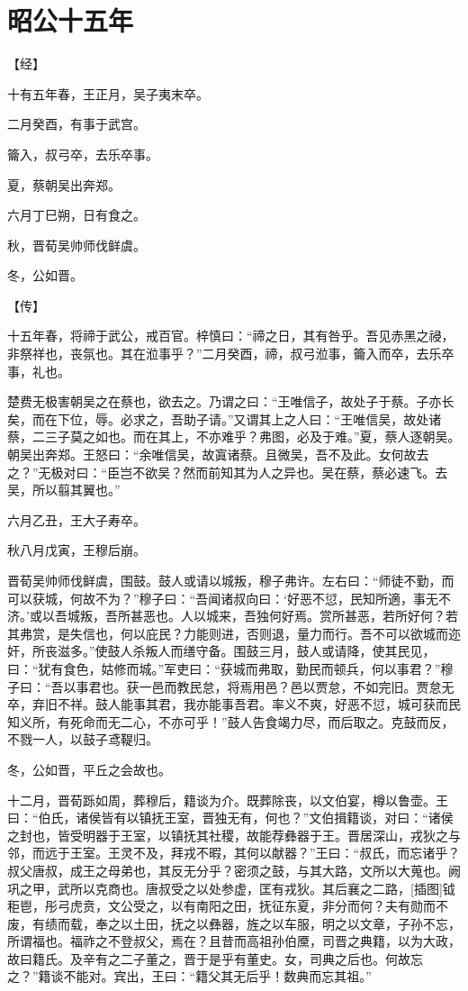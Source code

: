 \documentclass[a4paper,12pt,UTF8,twoside]{ctexbook}
\begin{document}
\section{昭公十五年}



【经】

十有五年春，王正月，吴子夷末卒。

二月癸酉，有事于武宫。

籥入，叔弓卒，去乐卒事。

夏，蔡朝吴出奔郑。

六月丁巳朔，日有食之。

秋，晋荀吴帅师伐鲜虞。

冬，公如晋。

【传】

十五年春，将禘于武公，戒百官。梓慎曰：“禘之日，其有咎乎。吾见赤黑之祲，非祭祥也，丧氛也。其在涖事乎？”二月癸酉，禘，叔弓涖事，籥入而卒，去乐卒事，礼也。

楚费无极害朝吴之在蔡也，欲去之。乃谓之曰：“王唯信子，故处子于蔡。子亦长矣，而在下位，辱。必求之，吾助子请。”又谓其上之人曰：“王唯信吴，故处诸蔡，二三子莫之如也。而在其上，不亦难乎？弗图，必及于难。”夏，蔡人逐朝吴。朝吴出奔郑。王怒曰：“余唯信吴，故寘诸蔡。且微吴，吾不及此。女何故去之？”无极对曰：“臣岂不欲吴？然而前知其为人之异也。吴在蔡，蔡必速飞。去吴，所以翦其翼也。”

六月乙丑，王大子寿卒。

秋八月戊寅，王穆后崩。

晋荀吴帅师伐鲜虞，围鼓。鼓人或请以城叛，穆子弗许。左右曰：“师徒不勤，而可以获城，何故不为？”穆子曰：“吾闻诸叔向曰：‘好恶不愆，民知所適，事无不济。’或以吾城叛，吾所甚恶也。人以城来，吾独何好焉。赏所甚恶，若所好何？若其弗赏，是失信也，何以庇民？力能则进，否则退，量力而行。吾不可以欲城而迩奸，所丧滋多。”使鼓人杀叛人而缮守备。围鼓三月，鼓人或请降，使其民见，曰：“犹有食色，姑修而城。”军吏曰：“获城而弗取，勤民而顿兵，何以事君？”穆子曰：“吾以事君也。获一邑而教民怠，将焉用邑？邑以贾怠，不如完旧。贾怠无卒，弃旧不祥。鼓人能事其君，我亦能事吾君。率义不爽，好恶不愆，城可获而民知义所，有死命而无二心，不亦可乎！”鼓人告食竭力尽，而后取之。克鼓而反，不戮一人，以鼓子鸢鞮归。

冬，公如晋，平丘之会故也。

十二月，晋荀跞如周，葬穆后，籍谈为介。既葬除丧，以文伯宴，樽以鲁壶。王曰：“伯氏，诸侯皆有以镇抚王室，晋独无有，何也？”文伯揖籍谈，对曰：“诸侯之封也，皆受明器于王室，以镇抚其社稷，故能荐彝器于王。晋居深山，戎狄之与邻，而远于王室。王灵不及，拜戎不暇，其何以献器？”王曰：“叔氏，而忘诸乎？叔父唐叔，成王之母弟也，其反无分乎？密须之鼓，与其大路，文所以大蒐也。阙巩之甲，武所以克商也。唐叔受之以处参虚，匡有戎狄。其后襄之二路，[插图]钺秬鬯，彤弓虎贲，文公受之，以有南阳之田，抚征东夏，非分而何？夫有勋而不废，有绩而载，奉之以土田，抚之以彝器，旌之以车服，明之以文章，子孙不忘，所谓福也。福祚之不登叔父，焉在？且昔而高祖孙伯黡，司晋之典籍，以为大政，故曰籍氏。及辛有之二子董之，晋于是乎有董史。女，司典之后也。何故忘之？”籍谈不能对。宾出，王曰：“籍父其无后乎！数典而忘其祖。”
\end{document}
